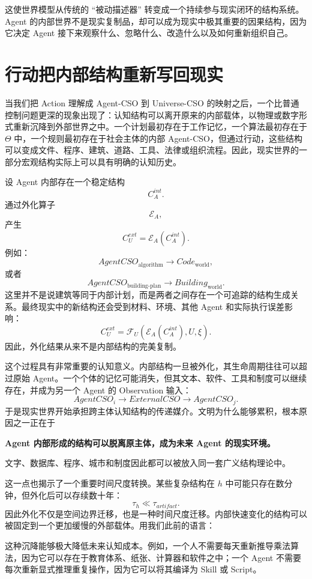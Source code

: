 这使世界模型从传统的 ``被动描述器'' 转变成一个持续参与现实闭环的结构系统。Agent 的内部世界不是现实复制品，却可以成为现实中极其重要的因果结构，因为它决定 Agent 接下来观察什么、忽略什么、改造什么以及如何重新组织自己。


\section{行动把内部结构重新写回现实}

当我们把 Action 理解成 Agent-CSO 到 Universe-CSO 的映射之后，一个比普通控制问题更深的现象出现了：认知结构可以离开原来的内部载体，以物理或数字形式重新沉降到外部世界之中。一个计划最初存在于工作记忆，一个算法最初存在于 $\Theta$ 中，一个规则最初存在于社会主体的内部 Agent-CSO，但通过行动，这些结构可以变成文件、程序、建筑、道路、工具、法律或组织流程。因此，现实世界的一部分宏观结构实际上可以具有明确的认知历史。

设 Agent 内部存在一个稳定结构
\[
C_A^{int}.
\]
通过外化算子
\[
\mathcal E_A,
\]
产生
\[
C_U^{ext}
=
\mathcal E_A(C_A^{int}).
\]
例如：
\[
AgentCSO_{\text{algorithm}}
\rightarrow
Code_{\text{world}},
\]
或者
\[
AgentCSO_{\text{building-plan}}
\rightarrow
Building_{\text{world}}.
\]
这里并不是说建筑等同于内部计划，而是两者之间存在一个可追踪的结构生成关系。最终现实中的新结构还会受到材料、环境、其他 Agent 和实际执行误差影响：
\[
C_U^{ext}
=
\mathcal F_U
\left(
\mathcal E_A(C_A^{int}),
U,
\xi
\right).
\]
因此，外化结果从来不是内部结构的完美复制。

这个过程具有非常重要的认知意义。内部结构一旦被外化，其生命周期往往可以超过原始 Agent。一个个体的记忆可能消失，但其文本、软件、工具和制度可以继续存在，并成为另一个 Agent 的 Observation 输入：
\[
AgentCSO_i
\rightarrow
ExternalCSO
\rightarrow
AgentCSO_j.
\]
于是现实世界开始承担跨主体认知结构的传递媒介。文明为什么能够累积，根本原因之一正在于
\begin{statementbox}
\centering\bfseries
Agent 内部形成的结构可以脱离原主体，成为未来 Agent 的现实环境。
\end{statementbox}
文字、数据库、程序、城市和制度因此都可以被放入同一套广义结构理论中。

这一点也揭示了一个重要时间尺度转换。某些复杂结构在 $h$ 中可能只存在数分钟，但外化后可以存续数十年：
\[
\tau_{h}
\ll
\tau_{artifact}.
\]
因此外化不仅是空间边界迁移，也是一种时间尺度迁移。内部快速变化的结构可以被固定到一个更加缓慢的外部载体。用我们此前的语言：
\begin{statementbox}
\centering
{}
\end{statementbox}
这种沉降能够极大降低未来认知成本。例如，一个人不需要每天重新推导乘法算法，因为它可以存在于教育体系、纸张、计算器和软件之中；一个 Agent 不需要每次重新显式推理重复操作，因为它可以将其编译为 Skill 或 Script。

